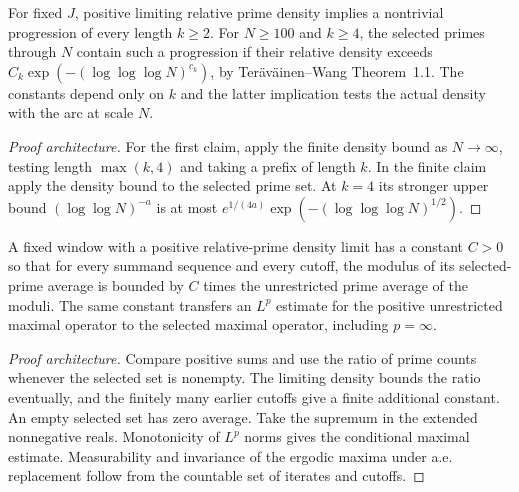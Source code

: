 \begin{lemma}\label{checked-prime-progressions}
\leanok
For fixed $J$, positive limiting relative prime density implies a
nontrivial progression of every length $k\ge2$. For $N\ge100$ and
$k\ge4$, the selected primes through
$N$ contain such a progression if their relative density exceeds
$C_k\exp(-(\log\log\log N)^{c_k})$, by Ter\"av\"ainen--Wang
Theorem~1.1. The constants depend only on $k$ and the latter
implication tests the actual density with the arc at scale $N$.
\end{lemma}
\begin{proof}[Proof architecture]
\leanok
For the first claim, apply the finite density bound as $N\to\infty$,
testing length $\max(k,4)$ and taking a prefix of length $k$.
In the finite claim apply the density bound to the selected prime set.
At $k=4$ its stronger upper bound $(\log\log N)^{-a}$ is at most
$e^{1/(4a)}\exp(-(\log\log\log N)^{1/2})$.
\end{proof}

\begin{lemma}\label{checked-maximal-domination}
\leanok
A fixed window with a positive relative-prime density limit has a
constant $C>0$ so that for every summand sequence and every cutoff,
the modulus of its selected-prime average is bounded by $C$
times the unrestricted prime average of the moduli. The same
constant transfers an $L^p$ estimate for the positive unrestricted
maximal operator to the selected maximal operator, including
$p=\infty$.
\end{lemma}
\begin{proof}[Proof architecture]
\leanok
Compare positive sums and use the ratio of prime counts whenever
the selected set is nonempty. The limiting density bounds the ratio
eventually, and the finitely many earlier cutoffs give a finite
additional constant. An empty selected set has zero average.
Take the supremum in the extended nonnegative reals. Monotonicity
of $L^p$ norms gives the conditional maximal estimate. Measurability
and invariance of the ergodic maxima under a.e. replacement follow
from the countable set of iterates and cutoffs.
\end{proof}
